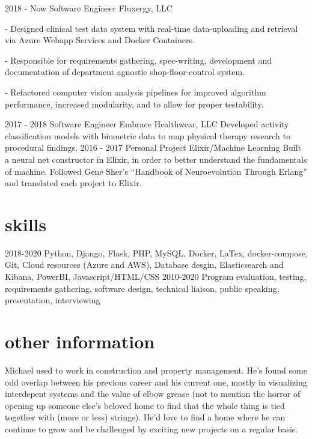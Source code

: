\documentclass[]{twentysecondcv}
\begin{document}
\begin{twenty}
  \twentyitem
    {2018 - Now}
    {Software Engineer}
    {Fluxergy, LLC}
    {- Designed clinical test data system with real-time data-uploading and retrieval via Azure Webapp Services and Docker Containers.
	
	- Responsible for requirements gathering, spec-writing, development and documentation of department agnostic shop-floor-control system.
	
	- Refactored computer vision analysis pipelines for improved algorithm performance, increased modularity, and to allow for proper testability.
	
}
  \twentyitem
    {2017 - 2018}
    {Software Engineer}
    {Embrace Healthwear, LLC}
    {Developed activity classification models with biometric data to map physical therapy research to procedural findings.} 
  \twentyitem
    {2016 - 2017}
    {Personal Project}
    {Elixir/Machine Learning}
    {Built a neural net constructor in Elixir, in order to better understand the fundamentals of machine. Followed Gene Sher's ``Handbook of Neuroevolution Through Erlang'' and translated each project to Elixir.} 
\end{twenty}

\section{skills}
	\begin{twentyshort}
	\twentyitemshort
	{2018-2020}
	{Python, Django, Flask, PHP, MySQL, Docker, LaTex, docker-compose, Git, Cloud resources (Azure and AWS), Database desgin, Elasticsearch and Kibana, PowerBI, Javascript/HTML/CSS}
	\twentyitemshort
	{2010-2020}
	{Program evaluation, testing, requirements gathering, software design, technical liaison, public speaking, presentation, interviewing}
	\end{twentyshort}
\section{other information}
Michael used to work in construction and property management. He's found some odd overlap between his previous career and his current one, mostly in visualizing interdepent systems and the value of elbow grease (not to mention the horror of opening up someone else's beloved home to find that the whole thing is tied together with (more or less) strings). He'd love to find a home where he can continue to grow and be challenged by exciting new projects on a regular basis.

\end{document}
